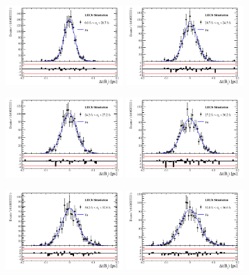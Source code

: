 \begin{figure}[h]
\centering
\includegraphics[height=!,width=0.4\textwidth]{figs/Resolution/SignalMC_bin_1.pdf}
\includegraphics[height=!,width=0.4\textwidth]{figs/Resolution/SignalMC_bin_2.pdf}

\includegraphics[height=!,width=0.4\textwidth]{figs/Resolution/SignalMC_bin_3.pdf}
\includegraphics[height=!,width=0.4\textwidth]{figs/Resolution/SignalMC_bin_4.pdf}

\includegraphics[height=!,width=0.4\textwidth]{figs/Resolution/SignalMC_bin_5.pdf}
\includegraphics[height=!,width=0.4\textwidth]{figs/Resolution/SignalMC_bin_6.pdf}


\end{figure}
